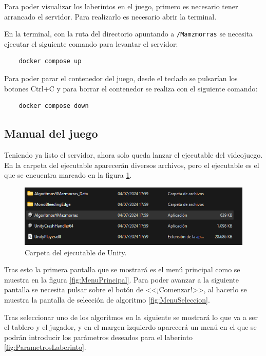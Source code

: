 Para poder visualizar los laberintos en el juego, primero es necesario tener arrancado el servidor. 
Para realizarlo es necesario abrir la terminal. 

En la terminal, con la ruta del directorio apuntando a \texttt{/Mamzmorras} se necesita ejecutar el siguiente comando para levantar el servidor:
\begin{lstlisting}
    docker compose up
\end{lstlisting}

Para poder parar el contenedor del juego, desde el teclado se pulsarían los botones Ctrl+C y para borrar el contenedor se realiza con el siguiente comando:
\begin{lstlisting}
    docker compose down
\end{lstlisting}

\subsection{Manual del juego}
Teniendo ya listo el servidor, ahora solo queda lanzar el ejecutable del videojuego. En la carpeta del ejecutable aparecerán diversos archivos, pero el ejecutable es el que se encuentra marcado en la figura \ref{fig:EjecutableUnity}.

\begin{figure}[!h]  
    \centering  
    \includegraphics[width=\textwidth]{img/EjecutableUnity.png}  
    \caption{Carpeta del ejecutable de Unity.}  
    \label{fig:EjecutableUnity}
\end{figure}

Tras esto la primera pantalla que se mostrará es el menú principal como se muestra en la figura \ref{fig:MenuPrincipal}. Para poder avanzar a la siguiente pantalla se necesita pulsar sobre el botón de <<¡Comenzar!>>, al hacerlo se muestra la pantalla de selección de algoritmo \ref{fig:MenuSeleccion}.

Tras seleccionar uno de los algoritmos en la siguiente se mostrará lo que va a ser el tablero y el jugador, y en el margen izquierdo aparecerá un menú en el que se podrán introducir los parámetros deseados para el laberinto \ref{fig:ParametrosLaberinto}.

